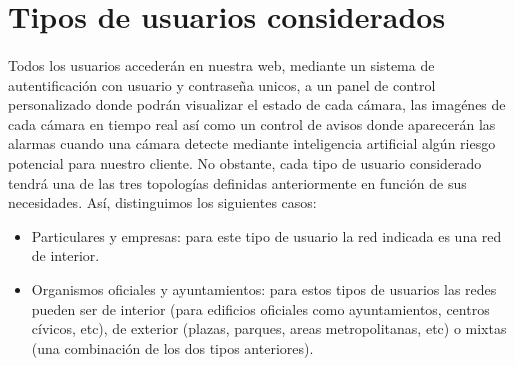\section{Tipos de usuarios considerados}

\paragraph{}
Todos los usuarios accederán en nuestra web, mediante un sistema de autentificación con usuario y contraseña unicos, a un panel de control
personalizado donde podrán visualizar el estado de cada cámara, las imagénes de cada cámara en tiempo real así como un control de avisos
donde aparecerán las alarmas cuando una cámara detecte mediante inteligencia artificial algún riesgo potencial para nuestro cliente. No obstante, 
cada tipo de usuario considerado tendrá una de las tres topologías definidas anteriormente en función de sus necesidades. Así, distinguimos los siguientes casos:

\begin{itemize}
    \item Particulares y empresas: para este tipo de usuario la red indicada es una red de interior.
    \item Organismos oficiales y ayuntamientos: para estos tipos de usuarios las redes pueden ser de interior (para edificios oficiales como ayuntamientos,
    centros cívicos, etc), de exterior (plazas, parques, areas metropolitanas, etc) o mixtas (una combinación de los dos tipos anteriores).
\end{itemize}